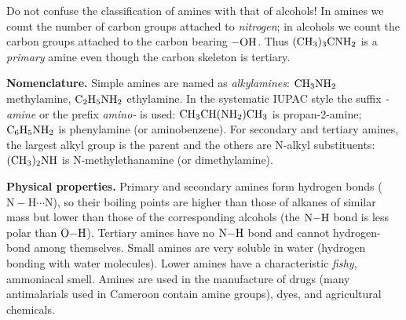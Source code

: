 \documentclass[11pt]{article}
\newcommand{\cle}[1]{{\popxbold\color{popdark}#1}}
\newcounter{popsec}
\newcounter{popsub}
\newcommand{\courssub}[1]{%
  \stepcounter{popsub}%
  \par\vspace{9pt}\noindent{\popxbold\fontsize{11.5}{13}\selectfont\color{popink}{\color{poporange}\thepopsec.\thepopsub}\hspace{6pt}#1}\par\nopagebreak\vspace{4pt}
}
\begin{document}
\begin{attention}
Do not confuse the classification of amines with that of alcohols! In amines we count the number of carbon groups attached to \emph{nitrogen}; in alcohols we count the carbon groups attached to the carbon bearing $\ce{-OH}$. Thus $\ce{(CH3)3CNH2}$ is a \emph{primary} amine even though the carbon skeleton is tertiary.
\end{attention}

\textbf{Nomenclature.} Simple amines are named as \emph{alkylamines}: $\ce{CH3NH2}$ methylamine, $\ce{C2H5NH2}$ ethylamine. In the systematic IUPAC style the suffix \emph{-amine} or the prefix \emph{amino-} is used: $\ce{CH3CH(NH2)CH3}$ is propan-2-amine; $\ce{C6H5NH2}$ is phenylamine (or aminobenzene). For secondary and tertiary amines, the largest alkyl group is the parent and the others are N-alkyl substituents: $\ce{(CH3)2NH}$ is N-methylethanamine (or dimethylamine).

\textbf{Physical properties.} Primary and secondary amines form \cle{hydrogen bonds} ($\ensuremath{\mathrm{N-H\cdots N}}$), so their boiling points are higher than those of alkanes of similar mass but lower than those of the corresponding alcohols (the $\ce{N-H}$ bond is less polar than $\ce{O-H}$). Tertiary amines have no $\ce{N-H}$ bond and cannot hydrogen-bond among themselves. Small amines are very soluble in water (hydrogen bonding with water molecules). Lower amines have a characteristic \emph{fishy}, ammoniacal smell. Amines are used in the manufacture of drugs (many antimalarials used in Cameroon contain amine groups), dyes, and agricultural chemicals.

\courssub{Preparation of Amines}
\end{document}
